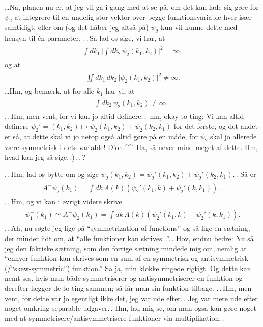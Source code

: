 \documentclass{report}
\begin{document}
\ldots Nå, planen nu er, at jeg vil gå i gang med at se på, om det kan lade sig gøre for $\psi_2$ at integrere til en undelig stor vektor over begge funktionsvariable hver især samtidigt, eller om (og det håber jeg altså på) $\psi_2$ kun vil kunne dette med hensyn til én parameter. .\,.\,Så lad os sige, vi har, at
\begin{align}
\begin{aligned}
	\int dk_1\, \bigg|\int dk_2\, \psi_2(k_1, k_2)\bigg|^2 = \infty,
\end{aligned}
\end{align}
og at
\begin{align}
\begin{aligned}
	\iint dk_1\, dk_2\, \big| \psi_2(k_1, k_2)\big|^2 \neq \infty.
\end{aligned}
\end{align}
\ldots Hm, og bemærk, at for alle $k_1$ har vi, at 
\begin{align}
\begin{aligned}
	\int dk_2\, \psi_2(k_1, k_2) \neq \infty.\,.
\end{aligned}
\end{align}
.\,.\,Hm, men vent, for vi kan jo altid definere.\,.\, hm, okay to ting: Vi kan altid definere $\psi_2' = (k_1, k_2) \mapsto \psi_2(k_1, k_2) + \psi_2(k_2, k_1)$ for det første, og det andet er så, at dette skal vi jo netop også altid gøre på en måde, for $\psi_2$ skal jo allerede være symmetrisk i dets variable! D'oh.\textasciicircum\textasciicircum\ Ha, så never mind meget af dette. Hm, hvad kan jeg så sige.\,:)\,.\,.\,?

.\,.\,Hm, lad os bytte om og sige $\psi_2(k_1, k_2) = \psi_2'(k_1, k_2) + \psi_2'(k_2, k_1)$.\,. Så er
\begin{align}
\begin{aligned}
	A^-\psi_2(k_1) = 
		\int dk\, \bar{A}(k)( \psi_2'(k_1, k) + \psi_2'(k, k_1) ).\,.
\end{aligned}
\end{align}
.\,.\,Hm, og vi kan i øvrigt videre skrive
\begin{align}
\begin{aligned}
	\psi_1^+(k_1) \simeq A^-\psi_2(k_1) = 
		\int dk\, \bar{A}(k)( \psi_2'(k_1, k) + \psi_2'(k, k_1) ).
\end{aligned}
\end{align}
.\,.\,Ah, nu søgte jeg lige på ``symmetrization of functions'' og så lige en sætning, der minder lidt om, at ``alle funktioner kan skrives.\,.''.\,. Hov, endnu bedre: Nu så jeg den faktiske sætning, som den forrige sætning mindede mig om, nemlig at ``enhver funktion kan skrives som en sum af en symmetrisk og antisymmetrisk (/``skew-symmetric'') funktion.'' Så ja, min klokke ringede rigtigt. Og dette kan nemt ses, hvis man både symmetriserer og antisymmetriserer en funktion og derefter lægger de to ting sammen; så får man sin funktion tilbage. .\,.\,Hm, men vent, for dette var jo egentligt ikke det, jeg var ude efter.\,. Jeg var mere ude efter noget omkring separable udgaver.\,. Hm, lad mig se, om man også kan gøre noget med at symmetrisere/antisymmetrisere funktioner via multiplikation.\,. 
\end{document}
